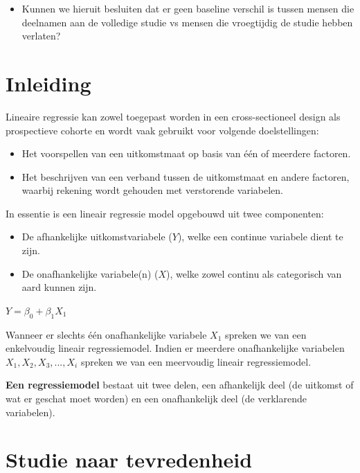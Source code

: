 \documentclass[
]{book}
\providecommand{\tightlist}{%
  \setlength{\itemsep}{0pt}\setlength{\parskip}{0pt}}
\theoremstyle{definition}
\theoremstyle{definition}
\theoremstyle{definition}
\theoremstyle{definition}
\theoremstyle{remark}
\begin{document}
\begin{itemize}
\tightlist
\item
  Kunnen we hieruit besluiten dat er geen baseline verschil is tussen mensen die deelnamen aan de volledige studie vs mensen die vroegtijdig de studie hebben verlaten?
\end{itemize}

\hypertarget{inleiding-1}{%
\section*{Inleiding}\label{inleiding-1}}


Lineaire regressie kan zowel toegepast worden in een cross-sectioneel design als prospectieve cohorte en wordt vaak gebruikt voor volgende doelstellingen:

\begin{itemize}
\tightlist
\item
  Het voorspellen van een uitkomstmaat op basis van één of meerdere factoren.
\item
  Het beschrijven van een verband tussen de uitkomstmaat en andere factoren, waarbij rekening wordt gehouden met verstorende variabelen.
\end{itemize}

In essentie is een lineair regressie model opgebouwd uit twee componenten:

\begin{itemize}
\tightlist
\item
  De afhankelijke uitkomstvariabele (\(Y\)), welke een continue variabele dient te zijn.
\item
  De onafhankelijke variabele(n) (\(X\)), welke zowel continu als categorisch van aard kunnen zijn.
\end{itemize}

\(Y = \beta_0 + \beta_1 X_1\)

Wanneer er slechts één onafhankelijke variabele \(X_1\) spreken we van een enkelvoudig lineair regressiemodel. Indien er meerdere onafhankelijke variabelen \(X_1, X_2, X_3,..., X_i\) spreken we van een meervoudig lineair regressiemodel.

\textbf{Een regressiemodel} bestaat uit twee delen, een afhankelijk deel (de uitkomst of wat er geschat moet worden) en een onafhankelijk deel (de verklarende variabelen).

\hypertarget{studie-naar-tevredenheid-1}{%
\section*{Studie naar tevredenheid}\label{studie-naar-tevredenheid-1}}
\end{document}

